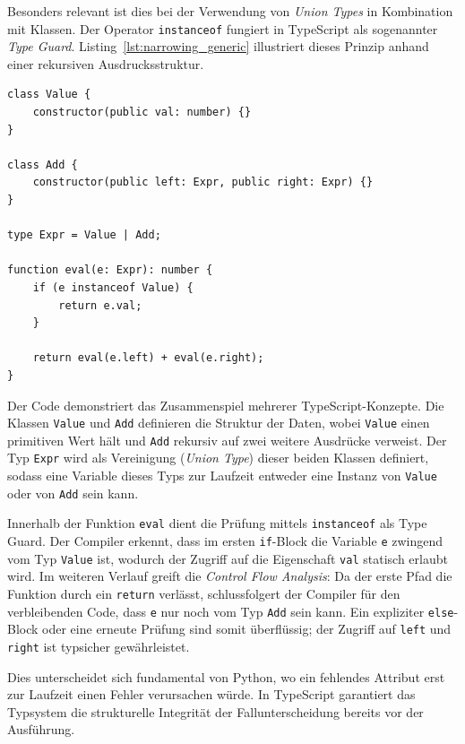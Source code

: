 Besonders relevant ist dies bei der Verwendung von \emph{Union Types} in Kombination mit Klassen. Der Operator \texttt{instanceof} fungiert in TypeScript als sogenannter \emph{Type Guard}. Listing~\ref{lst:narrowing_generic} illustriert dieses Prinzip anhand einer rekursiven Ausdrucksstruktur.

\begin{listing}[H]
	\caption{Type Narrowing mittels \texttt{instanceof} und Control Flow Analysis}
	\label{lst:narrowing_generic}
	\begin{verbatim}
class Value { 
	constructor(public val: number) {} 
}

class Add { 
	constructor(public left: Expr, public right: Expr) {} 
}

type Expr = Value | Add;

function eval(e: Expr): number {
	if (e instanceof Value) {
		return e.val;
	}
	
	return eval(e.left) + eval(e.right);
}
	\end{verbatim}
\end{listing}

Der Code demonstriert das Zusammenspiel mehrerer TypeScript-Konzepte. Die Klassen \texttt{Value} und \texttt{Add} definieren die Struktur der Daten, wobei \texttt{Value} einen primitiven Wert hält und \texttt{Add} rekursiv auf zwei weitere Ausdrücke verweist. Der Typ \texttt{Expr} wird als Vereinigung (\emph{Union Type}) dieser beiden Klassen definiert, sodass eine Variable dieses Typs zur Laufzeit entweder eine Instanz von \texttt{Value} oder von \texttt{Add} sein kann.

Innerhalb der Funktion \texttt{eval} dient die Prüfung mittels \texttt{instanceof} als Type Guard. Der Compiler erkennt, dass im ersten \texttt{if}-Block die Variable \texttt{e} zwingend vom Typ \texttt{Value} ist, wodurch der Zugriff auf die Eigenschaft \texttt{val} statisch erlaubt wird. Im weiteren Verlauf greift die \emph{Control Flow Analysis}: Da der erste Pfad die Funktion durch ein \texttt{return} verlässt, schlussfolgert der Compiler für den verbleibenden Code, dass \texttt{e} nur noch vom Typ \texttt{Add} sein kann. Ein expliziter \texttt{else}-Block oder eine erneute Prüfung sind somit überflüssig; der Zugriff auf \texttt{left} und \texttt{right} ist typsicher gewährleistet.

Dies unterscheidet sich fundamental von Python, wo ein fehlendes Attribut erst zur Laufzeit einen Fehler verursachen würde. In TypeScript garantiert das Typsystem die strukturelle Integrität der Fallunterscheidung bereits vor der Ausführung.

